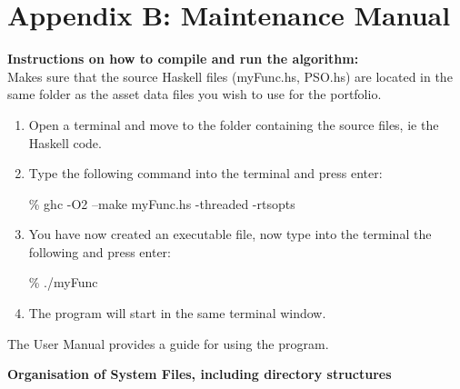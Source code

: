 \documentclass{pdfmx4020}
\begin{document}
\chapter*{Appendix B: Maintenance Manual}

\textbf{Instructions on how to compile and run the algorithm:} \\
Makes sure that the source Haskell files (myFunc.hs, PSO.hs) are located in the same folder as the asset data files you wish to use for the portfolio.

\begin{enumerate}
  \item Open a terminal and move to the folder containing the source files, ie the Haskell code.
  \item Type the following command into the terminal and press enter:
\begin{center} \% ghc -O2 --make myFunc.hs -threaded -rtsopts \end{center}
  \item You have now created an executable file, now type into the terminal the following and press enter:
\begin{center} \% ./myFunc \end{center}
  \item The program will start in the same terminal window.
\end{enumerate}
The User Manual provides a guide for using the program. 

\textbf{Organisation of System Files, including directory structures} \\
\end{document}
